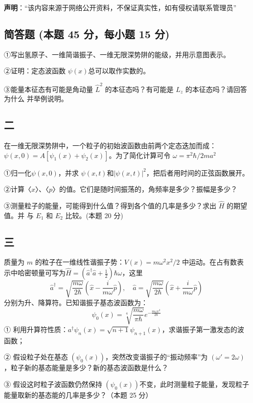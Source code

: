 
\textbf{声明}：“该内容来源于网络公开资料，不保证真实性，如有侵权请联系管理员”

\subsection{简答题 (本题 45 分，每小题 15 分)}
①写出氢原子、一维简谐振子、一维无限深势阱的能级，并用示意图表示。

②证明：定态波函数 $\psi(x)$总可以取作实数的。

③能量本征态有可能是角动量 $\hat{L}^2$ 的本征态吗？有可能是 $\hat{L}_z$ 的本征态吗？请回答为什么
并举例说明。

\subsection{二}
在一维无限深势阱中，一个粒子的初始波函数由前两个定态迭加而成：$\psi(x,0)=A[\psi_1 (x)
+\psi_2 (x)]$。为了简化计算可令 $\omega=\pi^2\hbar/2ma^2$

①归一化$\psi(x,0)$，并求 $\psi(x,t)$和$|\psi(x,t)|^2$，把后者用时间的正弦函数展开。

②计算〈$x$〉、〈$p$〉的值。它们是随时间振荡的，角频率是多少？振幅是多少？

③测量粒子的能量，可能得到什么值？得到各个值的几率是多少？求出 $\hat{H}$ 的期望值。并
与 $E_1$ 和 $E_2$ 比较。(本题 20 分)

\subsection{三}
质量为 $m$ 的粒子在一维线性谐振子势：$V(x)=m\omega^2x^2/2$ 中运动。在占有数表示中哈密顿量可写为$\hat{H} = \left(\hat{a}^\dagger \hat{a} + \frac{1}{2}\right)\hbar\omega$，这里 
$$\hat{a}^\dagger = \sqrt{\frac{m\omega}{2\hbar}} \left( \hat{x} - \frac{i}{m\omega} \hat{p} \right), \quad \hat{a} = \sqrt{\frac{m\omega}{2\hbar}} \left( \hat{x} + \frac{i}{m\omega} \hat{p} \right)~$$分别为升、降算符。已知谐振子基态波函数为：
$$\psi_0(x) = \sqrt[4]{\frac{m\omega}{\pi \hbar}} e^{-\frac{m\omega x^2}{2 \hbar}}~$$
① 利用升算符性质：$a^{\dagger} \psi_n(x) = \sqrt{n+1} \psi_{n+1}(x)$，求谐振子第一激发态的波函数；

② 假设粒子处在基态 $( \psi_0(x) )$，突然改变谐振子的“振动频率”为 $( \omega' = 2\omega )$，粒子新的基态能量是多少？新的基态波函数是什么？

③ 假设这时粒子波函数仍然保持 $( \psi_0(x) )$不变，此时测量粒子能量，发现粒子能量取新的基态能的几率是多少？（本题 25 分）

